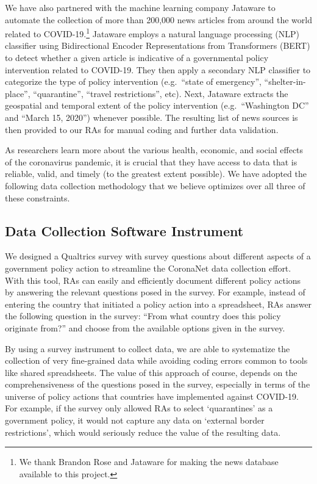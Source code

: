 \documentclass[]{article}
\let\rmarkdownfootnote\footnote%
\def\footnote{\protect\rmarkdownfootnote}
\begin{document}
We have also partnered with the machine learning company Jataware to automate the collection of more than 200,000 news articles from around the world related to COVID-19.\footnote{We thank Brandon Rose and Jataware for making the news database available to this project.} Jataware employs a natural language processing (NLP) classifier using Bidirectional Encoder Representations from Transformers (BERT) to detect whether a given article is indicative of a governmental policy intervention related to COVID-19. They then apply a secondary NLP classifier to categorize the type of policy intervention (e.g.~``state of emergency'', ``shelter-in-place'', ``quarantine'', ``travel restrictions'', etc). Next, Jataware extracts the geospatial and temporal extent of the policy intervention (e.g.~``Washington DC'' and ``March 15, 2020'') whenever possible. The resulting list of news sources is then provided to our RAs for manual coding and further data validation.

As researchers learn more about the various health, economic, and social effects of the coronavirus pandemic, it is crucial that they have access to data that is reliable, valid, and timely (to the greatest extent possible). We have adopted the following data collection methodology that we believe optimizes over all three of these constraints.

\hypertarget{data-collection-software-instrument}{%
\subsection{Data Collection Software Instrument}\label{data-collection-software-instrument}}

We designed a Qualtrics survey with survey questions about different aspects of a government policy action to streamline the CoronaNet data collection effort. With this tool, RAs can easily and efficiently document different policy actions by answering the relevant questions posed in the survey. For example, instead of entering the country that initiated a policy action into a spreadsheet, RAs answer the following question in the survey: ``From what country does this policy originate from?'' and choose from the available options given in the survey.

By using a survey instrument to collect data, we are able to systematize the collection of very fine-grained data while avoiding coding errors common to tools like shared spreadsheets. The value of this approach of course, depends on the comprehensiveness of the questions posed in the survey, especially in terms of the universe of policy actions that countries have implemented against COVID-19. For example, if the survey only allowed RAs to select `quarantines' as a government policy, it would not capture any data on `external border restrictions', which would seriously reduce the value of the resulting data.
\end{document}
